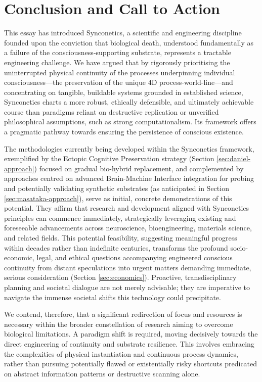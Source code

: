 \documentclass[10pt]{article}
\begin{document}
\begin{sloppypar}
  \section{Conclusion and Call to Action}
  \label{sec:conclusion}
  This essay has introduced Synconetics, a scientific and engineering discipline founded upon the conviction that biological death, understood fundamentally as a failure of the consciousness-supporting substrate, represents a tractable engineering challenge. We have argued that by rigorously prioritising the uninterrupted physical continuity of the processes underpinning individual consciousness—the preservation of the unique 4D process-world-line—and concentrating on tangible, buildable systems grounded in established science, Synconetics charts a more robust, ethically defensible, and ultimately achievable course than paradigms reliant on destructive replication or unverified philosophical assumptions, such as strong computationalism. Its framework offers a pragmatic pathway towards ensuring the persistence of conscious existence.

  The methodologies currently being developed within the Synconetics framework, exemplified by the Ectopic Cognitive Preservation strategy (Section \ref{sec:daniel-approach}) focused on gradual bio-hybrid replacement, and complemented by approaches centred on advanced Brain-Machine Interface integration for probing and potentially validating synthetic substrates (as anticipated in Section \ref{sec:masataka-approach}), serve as initial, concrete demonstrations of this potential. They affirm that research and development aligned with Synconetics principles can commence immediately, strategically leveraging existing and foreseeable advancements across neuroscience, bioengineering, materials science, and related fields. This potential feasibility, suggesting meaningful progress within decades rather than indefinite centuries, transforms the profound socio-economic, legal, and ethical questions accompanying engineered conscious continuity from distant speculations into urgent matters demanding immediate, serious consideration (Section \ref{sec:economics}). Proactive, transdisciplinary planning and societal dialogue are not merely advisable; they are imperative to navigate the immense societal shifts this technology could precipitate.

  We contend, therefore, that a significant redirection of focus and resources is necessary within the broader constellation of research aiming to overcome biological limitations. A paradigm shift is required, moving decisively towards the direct engineering of continuity and substrate resilience. This involves embracing the complexities of physical instantiation and continuous process dynamics, rather than pursuing potentially flawed or existentially risky shortcuts predicated on abstract information patterns or destructive scanning alone.


\end{sloppypar}
\end{document}
